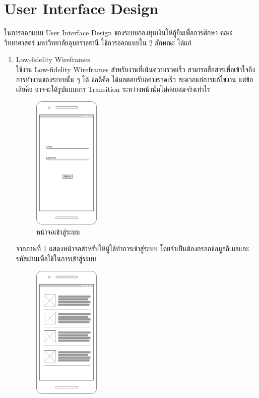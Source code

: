 \section{User Interface Design}
ในการออกแบบ User Interface Design ของระบบกองทุนเงินให้กู้ยืมเพื่อการศึกษา คณะวิทยาศาสตร์ มหาวิทยาลัยอุบลราชธานี ใช้การออกแบบใน 2 ลักษณะ ได้แก่
	\begin{enumerate}
		\item Low-fidelity Wireframes \\ 
		ใช้งาน Low-fidelity Wireframes สำหรับงานที่เน้นความรวดเร็ว สามารถสื่อสารเพื่อเข้าใจถึงการทำงานของระบบนั้น ๆ ได้ ข้อดีคือ ได้ผลตอบรับอย่างรวดเร็ว สะดวกแก่การแก้ไขงาน แต่ข้อเสียคือ อาจจะได้รูปแบบการ Transition ระหว่างหน้านั้นไม่ค่อยสมจริงเท่าไร
			\begin{figure}[H]
				\centering
				\includegraphics[width=0.3\textwidth]{Figures/3/Wireframe/login}
				\caption{หน้าจอเข้าสู่ระบบ}
				\label{Fig:หน้าจอเข้าสู่ระบบ}
			\end{figure}
			จากภาพที่ \ref{Fig:หน้าจอเข้าสู่ระบบ} แสดงหน้าจอสำหรับให้ผู้ใช้ทำการเข้าสู่ระบบ โดยจำเป็นต้องกรอกข้อมูลอีเมลและรหัสผ่านเพื่อใช้ในการเข้าสู่ระบบ
			\begin{figure}[H]
				\centering
				\includegraphics[width=0.3\textwidth]{Figures/3/Wireframe/feed}

\end{figure}
\end{enumerate}
